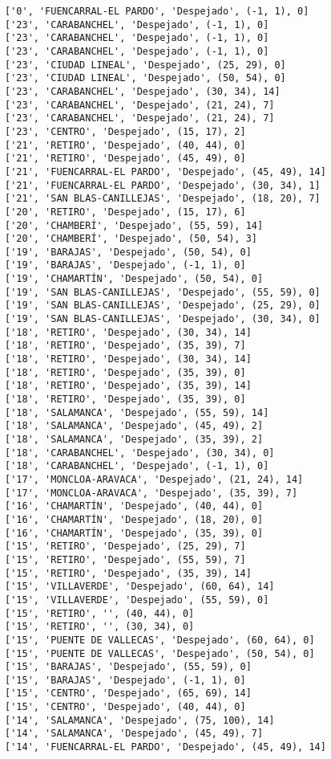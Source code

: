 \documentclass[11pt]{article}
\begin{document}
\begin{Verbatim}[commandchars=\\\{\}]
['0', 'FUENCARRAL-EL PARDO', 'Despejado', (-1, 1), 0]
['23', 'CARABANCHEL', 'Despejado', (-1, 1), 0]
['23', 'CARABANCHEL', 'Despejado', (-1, 1), 0]
['23', 'CARABANCHEL', 'Despejado', (-1, 1), 0]
['23', 'CIUDAD LINEAL', 'Despejado', (25, 29), 0]
['23', 'CIUDAD LINEAL', 'Despejado', (50, 54), 0]
['23', 'CARABANCHEL', 'Despejado', (30, 34), 14]
['23', 'CARABANCHEL', 'Despejado', (21, 24), 7]
['23', 'CARABANCHEL', 'Despejado', (21, 24), 7]
['23', 'CENTRO', 'Despejado', (15, 17), 2]
['21', 'RETIRO', 'Despejado', (40, 44), 0]
['21', 'RETIRO', 'Despejado', (45, 49), 0]
['21', 'FUENCARRAL-EL PARDO', 'Despejado', (45, 49), 14]
['21', 'FUENCARRAL-EL PARDO', 'Despejado', (30, 34), 1]
['21', 'SAN BLAS-CANILLEJAS', 'Despejado', (18, 20), 7]
['20', 'RETIRO', 'Despejado', (15, 17), 6]
['20', 'CHAMBERÍ', 'Despejado', (55, 59), 14]
['20', 'CHAMBERÍ', 'Despejado', (50, 54), 3]
['19', 'BARAJAS', 'Despejado', (50, 54), 0]
['19', 'BARAJAS', 'Despejado', (-1, 1), 0]
['19', 'CHAMARTÍN', 'Despejado', (50, 54), 0]
['19', 'SAN BLAS-CANILLEJAS', 'Despejado', (55, 59), 0]
['19', 'SAN BLAS-CANILLEJAS', 'Despejado', (25, 29), 0]
['19', 'SAN BLAS-CANILLEJAS', 'Despejado', (30, 34), 0]
['18', 'RETIRO', 'Despejado', (30, 34), 14]
['18', 'RETIRO', 'Despejado', (35, 39), 7]
['18', 'RETIRO', 'Despejado', (30, 34), 14]
['18', 'RETIRO', 'Despejado', (35, 39), 0]
['18', 'RETIRO', 'Despejado', (35, 39), 14]
['18', 'RETIRO', 'Despejado', (35, 39), 0]
['18', 'SALAMANCA', 'Despejado', (55, 59), 14]
['18', 'SALAMANCA', 'Despejado', (45, 49), 2]
['18', 'SALAMANCA', 'Despejado', (35, 39), 2]
['18', 'CARABANCHEL', 'Despejado', (30, 34), 0]
['18', 'CARABANCHEL', 'Despejado', (-1, 1), 0]
['17', 'MONCLOA-ARAVACA', 'Despejado', (21, 24), 14]
['17', 'MONCLOA-ARAVACA', 'Despejado', (35, 39), 7]
['16', 'CHAMARTÍN', 'Despejado', (40, 44), 0]
['16', 'CHAMARTÍN', 'Despejado', (18, 20), 0]
['16', 'CHAMARTÍN', 'Despejado', (35, 39), 0]
['15', 'RETIRO', 'Despejado', (25, 29), 7]
['15', 'RETIRO', 'Despejado', (55, 59), 7]
['15', 'RETIRO', 'Despejado', (35, 39), 14]
['15', 'VILLAVERDE', 'Despejado', (60, 64), 14]
['15', 'VILLAVERDE', 'Despejado', (55, 59), 0]
['15', 'RETIRO', '', (40, 44), 0]
['15', 'RETIRO', '', (30, 34), 0]
['15', 'PUENTE DE VALLECAS', 'Despejado', (60, 64), 0]
['15', 'PUENTE DE VALLECAS', 'Despejado', (50, 54), 0]
['15', 'BARAJAS', 'Despejado', (55, 59), 0]
['15', 'BARAJAS', 'Despejado', (-1, 1), 0]
['15', 'CENTRO', 'Despejado', (65, 69), 14]
['15', 'CENTRO', 'Despejado', (40, 44), 0]
['14', 'SALAMANCA', 'Despejado', (75, 100), 14]
['14', 'SALAMANCA', 'Despejado', (45, 49), 7]
['14', 'FUENCARRAL-EL PARDO', 'Despejado', (45, 49), 14]

\end{Verbatim}
\end{document}
